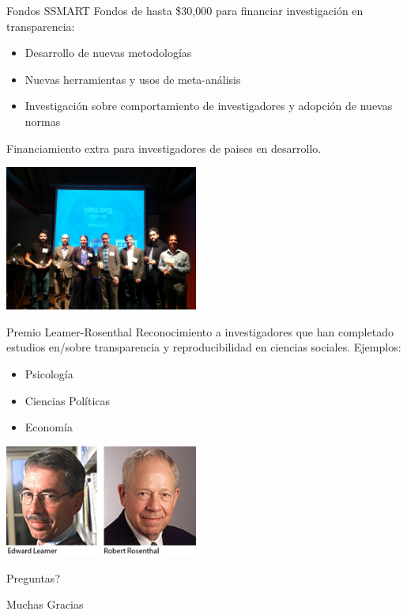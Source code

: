 \documentclass{beamer}
\begin{document}
\begin{frame}{Fondos SSMART}
Fondos de hasta \$30,000 para financiar investigación en transparencia:
\begin{itemize}[<.->]
\item Desarrollo de nuevas metodologías
\item Nuevas herramientas y usos de meta-análisis
\item Investigación sobre comportamiento de investigadores y adopción de nuevas normas
\end{itemize}
Financiamiento extra para investigadores de paises en desarrollo.

\includegraphics[width=2.5in]{../Images/LRwinners.jpg}
\end{frame}

\begin{frame}{Premio Leamer-Rosenthal}
Reconocimiento a investigadores que han completado estudios en/sobre transparencia y reproducibilidad en ciencias sociales.
Ejemplos:
\begin{itemize}[<.->]
\item Psicología
\item Ciencias Políticas
\item Economía
\end{itemize}
\includegraphics[width=2.5in]{../Images/leamer1-zoomed33.jpg}
\end{frame}


\begin{frame}
\begin{center}
Preguntas?
\vspace{0.5in}


\Huge{Muchas Gracias}
\end{center}
\end{frame}
\end{document}
